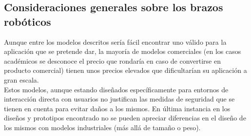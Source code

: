      \vspace{0.1cm}
 \subsection{Consideraciones generales sobre los brazos robóticos}
    Aunque entre los modelos descritos sería fácil encontrar uno válido para la aplicación que se pretende dar, la mayoría de modelos comerciales (en los casos académicos se desconoce el precio que rondaría en caso de convertirse en producto comercial) tienen unos precios elevados que dificultarían su aplicación a gran escala.
    \\

    Estos modelos, aunque estando diseñados específicamente para entornos de interacción directa con usuarios no justifican las medidas de seguridad que se tienen en cuenta para evitar daños a los mismos. En última instancia en los diseños y prototipos encontrado no se pueden apreciar diferencias en el diseño de los mismos con modelos industriales (más allá de tamaño o peso).
